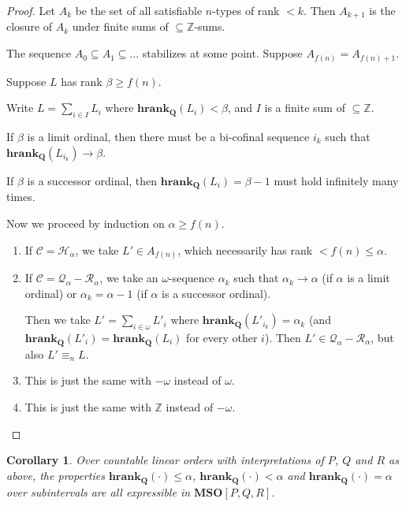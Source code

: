 \documentclass{article}
\newtheorem{corollary}{Corollary}
\newcommand{\hrank}[1]{\mathbf{hrank}_{\qq}\left( #1 \right)}
\newcommand{\agemo}{-\omega}
\newcommand{\mso}{\mathbf{MSO}}
\newcommand{\qq}{\mathbf{Q}}
\newcommand{\ZZ}{\mathbb{Z}}
\begin{document}
\begin{proof}
  Let $A_k$ be the set of all satisfiable $n$-types of rank $< k$.
  Then $A_{k+1}$ is the closure of $A_k$ under finite sums
  of $\subseteq \ZZ$-sums.

  The sequence $A_0 \subseteq A_1 \subseteq \ldots$ stabilizes at some point.
  Suppose $A_{f(n)} = A_{f(n) + 1}$.

  Suppose $L$ has rank $\beta \ge f(n)$.

  Write $L = \sum_{i \in I} L_i$ where $\hrank{L_i} < \beta$, and
  $I$ is a finite sum of $\subseteq \ZZ$.

  If $\beta$ is a limit ordinal, then there must be
  a bi-cofinal sequence $i_{k}$ such that $\hrank{L_{i_k}} \to \beta$.

  If $\beta$ is a successor ordinal, then $\hrank{L_i} = \beta - 1$ must hold
  infinitely many times.

  Now we proceed by induction on $\alpha \ge f(n)$.

  \begin{enumerate}
    \item If $\mathcal{C} = \mathcal{H}_{\alpha}$, we take $L' \in A_{f(n)}$,
          which necessarily has rank $< f(n) \le \alpha$.
    \item If $\mathcal{C} = \mathcal{Q}_{\alpha} - \mathcal{R}_{\alpha}$,
          we take an $\omega$-sequence $\alpha_k$ such that $\alpha_k \to \alpha$
          (if $\alpha$ is a limit ordinal) or $\alpha_k = \alpha-1$
          (if $\alpha$ is a successor ordinal).

          Then we take $L' = \sum_{i \in \omega} L'_i$ where $\hrank{L'_{i_k}} = \alpha_k$
          (and $\hrank{L'_i} = \hrank{L_i}$ for every other $i$).
          Then $L' \in \mathcal{Q}_{\alpha} - \mathcal{R}_{\alpha}$,
          but also $L' \equiv_n L$.
    \item This is just the same with $\agemo$ instead of $\omega$.
    \item This is just the same with $\ZZ$ instead of $\agemo$.
  \end{enumerate}
\end{proof}

\begin{corollary}
  Over countable linear orders with interpretations of $P$, $Q$ and $R$ as above, the properties
  $\hrank{\cdot} \le \alpha$, $\hrank{\cdot} < \alpha$ and $\hrank{\cdot} = \alpha$
  over subintervals are all expressible in $\mso[P, Q, R]$.
\end{corollary}
\end{document}
